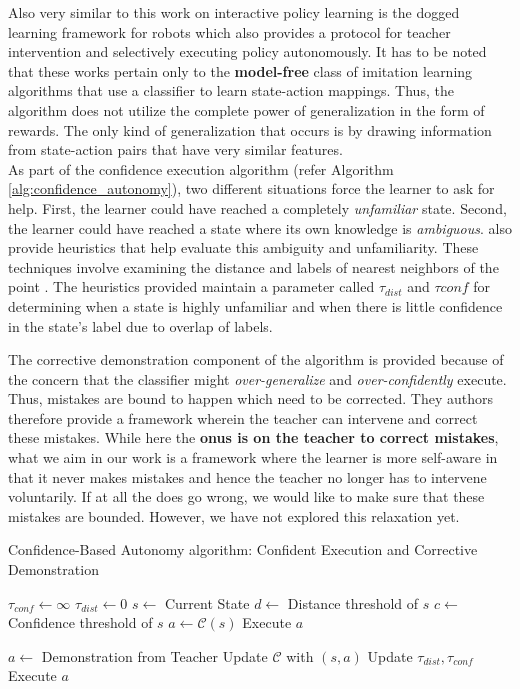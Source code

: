 Also very similar to this work on interactive policy learning is the dogged learning framework for robots \citet{DBLP:conf/icra/GrollmanJ07} which also provides a protocol for teacher intervention and selectively executing policy autonomously. It has to be noted that these works pertain only to the \textbf{model-free} class of imitation learning algorithms that use a classifier to learn state-action mappings. Thus, the algorithm does not utilize the complete power of generalization in the form of rewards. The only kind of generalization that occurs is by drawing information from state-action pairs that have very similar features. \\

As part of the confidence execution algorithm (refer Algorithm \ref{alg:confidence_autonomy}),  two different situations  force the learner to ask for help. First, the learner could have reached a completely \textit{unfamiliar} state. Second, the learner could have reached a state where its own knowledge is \textit{ambiguous}. \citet{Chernova:2009:IPL:1622716.1622717} also provide heuristics that help evaluate this ambiguity and unfamiliarity. These techniques involve examining the distance and labels of  nearest neighbors of the point . The heuristics provided maintain a parameter called $\tau_{dist}$ and $\tau{conf}$ for determining when a state is highly unfamiliar and when there is little confidence in the state's label due to overlap of labels.

The corrective demonstration component of the algorithm is provided because of the concern that the classifier might \textit{over-generalize} and \textit{over-confidently} execute. Thus, mistakes are bound to happen which need to be corrected. They authors therefore provide a framework wherein the teacher can intervene and correct these mistakes. While here the \textbf{onus is on the teacher to correct mistakes}, what we aim in our work is a framework where the learner is more self-aware in that it never makes mistakes and hence the teacher no longer has to intervene voluntarily. If at all the does go wrong, we would like to make sure that these mistakes are bounded. However, we have not explored this relaxation yet. \\


\begin{algorithm}[H]
\caption{ Confidence-Based Autonomy algorithm: Confident Execution and Corrective
Demonstration}
\label{alg:confidence_autonomy}
\begin{algorithmic}
\State $\tau_{conf} \gets \infty$
\State $\tau_{dist} \gets 0$
	\State $s \gets$ Current State
	\State $d \gets$ Distance threshold of $s$
	\State $c \gets$ Confidence threshold of $s$
	\State $a \gets \mathcal{C}(s)$
		\State Execute $a$
	
	\Else
		\State $a \gets $ Demonstration from Teacher
		\State Update $\mathcal{C}$ with $(s,a)$
		\State Update $\tau_{dist}, \tau_{conf}$
		\State Execute $a$
	\EndIf
\EndWhile
\end{algorithmic}
\end{algorithm}


